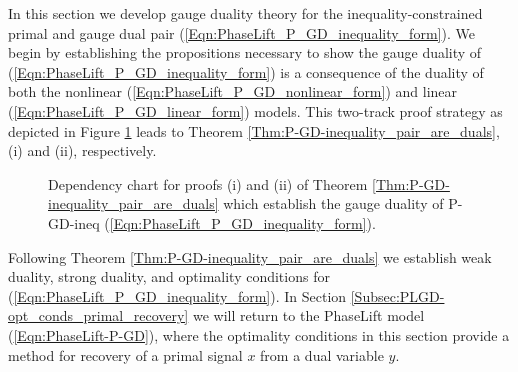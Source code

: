 In this section we develop gauge duality theory for the inequality-constrained primal and gauge dual pair (\ref{Eqn:PhaseLift_P_GD_inequality_form}).  We begin by establishing the propositions necessary to show the gauge duality of (\ref{Eqn:PhaseLift_P_GD_inequality_form}) is a consequence of the duality of both the nonlinear (\ref{Eqn:PhaseLift_P_GD_nonlinear_form}) and linear (\ref{Eqn:PhaseLift_P_GD_linear_form}) models.  This two-track proof strategy as depicted in Figure \ref{Fig:gauge_duality_thm_flowchart} leads to Theorem \ref{Thm:P-GD-inequality_pair_are_duals}, (i) and (ii), respectively.
\begin{figure}[H] 
\centering
\hspace{0cm}
\hspace{1cm}
\caption{Dependency chart for proofs (i) and (ii) of Theorem \ref{Thm:P-GD-inequality_pair_are_duals} which establish the gauge duality of P-GD-ineq (\ref{Eqn:PhaseLift_P_GD_inequality_form}).
  	}
\label{Fig:gauge_duality_thm_flowchart}
\end{figure}

Following Theorem \ref{Thm:P-GD-inequality_pair_are_duals} we establish weak duality, strong duality, and optimality conditions for (\ref{Eqn:PhaseLift_P_GD_inequality_form}).  In Section \ref{Subsec:PLGD-opt_conds_primal_recovery} we will return to the PhaseLift model (\ref{Eqn:PhaseLift-P-GD}), where the optimality conditions in this section provide a method for recovery of a primal signal $x$ from a dual variable $y$.


